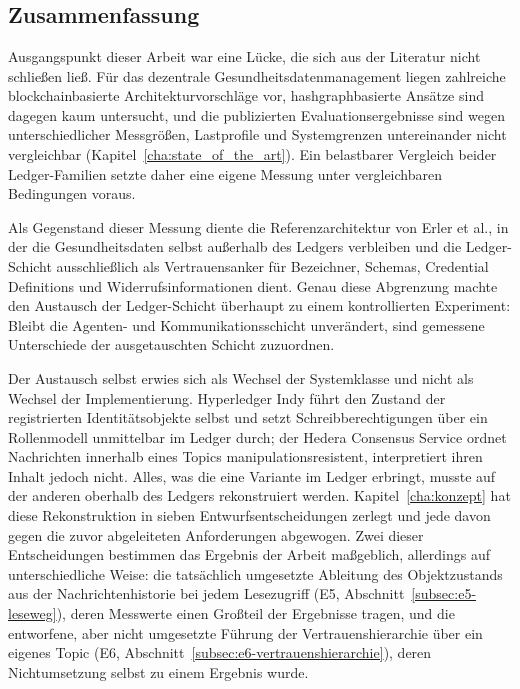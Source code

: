 \chapter{}
\label{cha:conclusion}

\section{Zusammenfassung}
\label{sec:conclusion-zusammenfassung}

Ausgangspunkt dieser Arbeit war eine Lücke, die sich aus der Literatur nicht schließen ließ. Für das dezentrale Gesundheitsdatenmanagement liegen zahlreiche blockchainbasierte Architekturvorschläge vor, hashgraphbasierte Ansätze sind dagegen kaum untersucht, und die publizierten Evaluationsergebnisse sind wegen unterschiedlicher Messgrößen, Lastprofile und Systemgrenzen untereinander nicht vergleichbar (Kapitel~\ref{cha:state_of_the_art}). Ein belastbarer Vergleich beider Ledger-Familien setzte daher eine eigene Messung unter vergleichbaren Bedingungen voraus.

Als Gegenstand dieser Messung diente die Referenzarchitektur von Erler et al., in der die Gesundheitsdaten selbst außerhalb des Ledgers verbleiben und die Ledger-Schicht ausschließlich als Vertrauensanker für Bezeichner, Schemas, Credential Definitions und Widerrufsinformationen dient. Genau diese Abgrenzung machte den Austausch der Ledger-Schicht überhaupt zu einem kontrollierten Experiment: Bleibt die Agenten- und Kommunikationsschicht unverändert, sind gemessene Unterschiede der ausgetauschten Schicht zuzuordnen.

Der Austausch selbst erwies sich als Wechsel der Systemklasse und nicht als Wechsel der Implementierung. Hyperledger Indy führt den Zustand der registrierten Identitätsobjekte selbst und setzt Schreibberechtigungen über ein Rollenmodell unmittelbar im Ledger durch; der Hedera Consensus Service ordnet Nachrichten innerhalb eines Topics manipulationsresistent, interpretiert ihren Inhalt jedoch nicht. Alles, was die eine Variante im Ledger erbringt, musste auf der anderen oberhalb des Ledgers rekonstruiert werden. Kapitel~\ref{cha:konzept} hat diese Rekonstruktion in sieben Entwurfsentscheidungen zerlegt und jede davon gegen die zuvor abgeleiteten Anforderungen abgewogen. Zwei dieser Entscheidungen bestimmen das Ergebnis der Arbeit maßgeblich, allerdings auf unterschiedliche Weise: die tatsächlich umgesetzte Ableitung des Objektzustands aus der Nachrichtenhistorie bei jedem Lesezugriff (E5, Abschnitt~\ref{subsec:e5-leseweg}), deren Messwerte einen Großteil der Ergebnisse tragen, und die entworfene, aber nicht umgesetzte Führung der Vertrauenshierarchie über ein eigenes Topic (E6, Abschnitt~\ref{subsec:e6-vertrauenshierarchie}), deren Nichtumsetzung selbst zu einem Ergebnis wurde.

